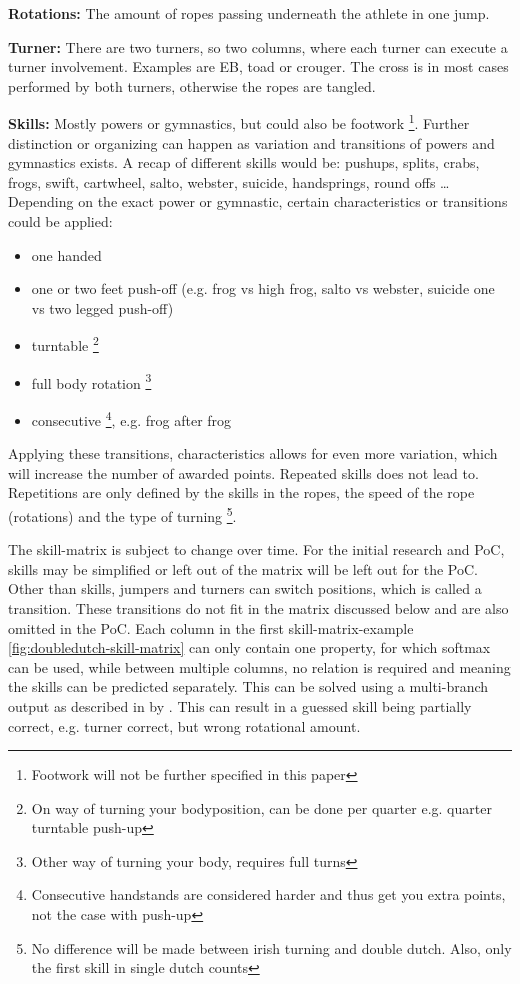 \textbf{Rotations:} The amount of ropes passing underneath the athlete in one jump.

\textbf{Turner:} There are two turners, so two columns, where each turner can execute a turner involvement. Examples are EB, toad or crouger. The cross is in most cases performed by both turners, otherwise the ropes are tangled.

\textbf{Skills:} Mostly powers or gymnastics, but could also be footwork \footnote{Footwork will not be further specified in this paper}. Further distinction or organizing can happen as variation and transitions of powers and gymnastics exists. A recap of different skills would be: pushups, splits, crabs, frogs, swift, cartwheel, salto, webster, suicide, handsprings, round offs \dots %
Depending on the exact power or gymnastic, certain characteristics or transitions could be applied:

\begin{itemize}
    \item one handed
    \item one or two feet push-off (e.g. frog vs high frog, salto vs webster, suicide one vs two legged push-off)
    \item turntable \footnote{On way of turning your bodyposition, can be done per quarter e.g. quarter turntable push-up}
    \item full body rotation \footnote{Other way of turning your body, requires full turns}
    \item consecutive \footnote{Consecutive handstands are considered harder and thus get you extra points, not the case with push-up}, e.g. frog after frog
\end{itemize}

Applying these transitions, characteristics allows for even more variation, which will increase the number of awarded points. Repeated skills does not lead to. Repetitions are only defined by the skills in the ropes, the speed of the rope (rotations) and the type of turning \footnote{No difference will be made between irish turning and double dutch. Also, only the first skill in single dutch counts}.

\medskip

The skill-matrix is subject to change over time. For the initial research and PoC, skills may be simplified or left out of the matrix will be left out for the PoC. Other than skills, jumpers and turners can switch positions, which is called a transition. These transitions do not fit in the matrix discussed below and are also omitted in the PoC.
Each column in the first skill-matrix-example \ref{fig:doubledutch-skill-matrix} can only contain one property, for which softmax can be used, while between multiple columns, no relation is required and meaning the skills can be predicted separately. This can be solved using a multi-branch output as described in by \textcite{Coulibaly_2022}. This can result in a guessed skill being partially correct, e.g. turner correct, but wrong rotational amount.




